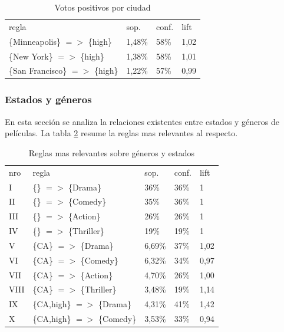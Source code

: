 \documentclass[journal]{IEEEtran}
\begin{document}
\begin{table}[ht!]
\caption{Votos positivos por ciudad}
\label{citi_high}
\centering
\begin{tabular}{l l l l }
regla & sop. & conf. & lift \\
\{Minneapolis\} $=$$>$ \{high\} & 1,48\% & 58\% & 1,02 \\
\{New York\} $=$$>$ \{high\} & 1,38\% & 58\% & 1,01 \\
\{San Francisco\} $=$$>$ \{high\} & 1,22\% & 57\% & 0,99 \\
\end{tabular}
\end{table}


\subsubsection{Estados y géneros}
En esta sección se analiza la relaciones existentes entre estados y géneros
de películas. La tabla \ref{table_genre_state} resume la reglas mas relevantes al respecto.

\begin{table}[ht!]
\caption{Reglas mas relevantes sobre géneros y estados}
\label{table_genre_state}
\centering
\begin{tabular}{l l l l l }
nro & regla & sop. & conf. & lift \\
I & \{\} $=$$>$ \{Drama\} & 36\% & 36\% & 1 \\
II & \{\} $=$$>$ \{Comedy\} & 35\% & 36\% & 1 \\
III & \{\} $=$$>$ \{Action\} & 26\% & 26\% & 1 \\
IV & \{\} $=$$>$ \{Thriller\} & 19\% & 19\% & 1 \\
V & \{CA\} $=$$>$ \{Drama\} & 6,69\% & 37\% & 1,02 \\
VI & \{CA\} $=$$>$ \{Comedy\} & 6,32\% & 34\% & 0,97 \\
VII & \{CA\} $=$$>$ \{Action\} & 4,70\% & 26\% & 1,00 \\
VIII & \{CA\} $=$$>$ \{Thriller\} & 3,48\% & 19\% & 1,14 \\
IX & \{CA,high\} $=$$>$ \{Drama\} & 4,31\% & 41\% & 1,42 \\
X & \{CA,high\} $=$$>$ \{Comedy\} & 3,53\% & 33\% & 0,94 \\
\end{tabular}
\end{table}
\end{document}
